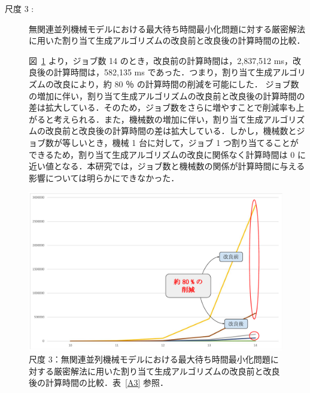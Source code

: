 \documentclass[12pt]{optlab-bachelor}
\begin{document}
\begin{description}
  \item[尺度 3 :] 無関連並列機械モデルにおける最大待ち時間最小化問題に対する厳密解法に用いた割り当て生成アルゴリズムの改良前と改良後の計算時間の比較．

  図~\ref{5.3} より，ジョブ数 14 のとき，改良前の計算時間は，2,837,512 ms，改良後の計算時間は，582,135 ms であった．つまり，割り当て生成アルゴリズムの改良により，約 80 ％ の計算時間の削減を可能にした．
  ジョブ数の増加に伴い，割り当て生成アルゴリズムの改良前と改良後の計算時間の差は拡大している．そのため，ジョブ数をさらに増やすことで削減率も上がると考えられる．また，機械数の増加に伴い，割り当て生成アルゴリズムの改良前と改良後の計算時間の差は拡大している．しかし，機械数とジョブ数が等しいとき，機械 1 台に対して，ジョブ 1 つ割り当てることができるため，割り当て生成アルゴリズムの改良に関係なく計算時間は 0 に近い値となる．本研究では，ジョブ数と機械数の関係が計算時間に与える影響については明らかにできなかった．
\end{description}
\begin{figure}[ht]
  \centering
  \includegraphics[width = 16cm]{figure/rgfTimeUn.pdf}
  \caption{尺度 3：無関連並列機械モデルにおける最大待ち時間最小化問題に対する厳密解法に用いた割り当て生成アルゴリズムの改良前と改良後の計算時間の比較．表~\ref{A3} 参照．}
  \label{5.3}
\end{figure}
\end{document}
